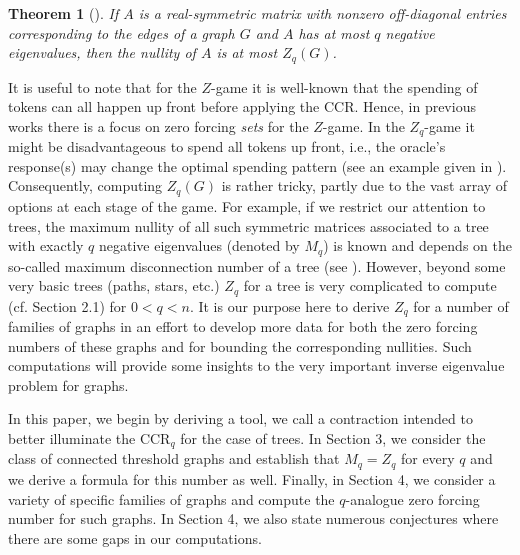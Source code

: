 \documentclass[3p,times,12pt]{article}
\newtheorem{theorem}{Theorem}[section]
\begin{document}
\begin{theorem}[\cite{BGH}]
If $A$ is a real-symmetric matrix with nonzero off-diagonal entries corresponding to the edges of a graph $G$ \emph{and} $A$ has at most $q$ negative eigenvalues, then the nullity of $A$ is at most  $Z_q(G)$.
\end{theorem}

It is useful to note that for the $Z$-game it is well-known that the spending of tokens can all happen up front before applying the CCR.  Hence, in previous works there is a focus on zero forcing \emph{sets} for the $Z$-game.  In the $Z_q$-game it might be disadvantageous to spend all tokens up front, i.e., the oracle's response(s) may change the optimal spending pattern (see an example given in \cite{BGH}). Consequently, computing $Z_q(G)$ is rather tricky, partly due to the vast array of options at each stage of the game. For example, if we restrict our attention to trees, the maximum nullity of all such symmetric matrices associated to a tree with exactly $q$ negative eigenvalues (denoted by $M_q$) is known and depends on the so-called maximum disconnection number of a tree (see \cite{BHL}). However, beyond some very basic trees (paths, stars, etc.) $Z_q$ for a tree is very complicated to compute (cf. Section 2.1) for $0 < q < n$. It is our purpose here to derive $Z_q$ for a number of families of graphs in an effort to develop more data for both the zero forcing numbers of these graphs and for bounding the corresponding nullities. Such computations will provide some insights to the very important inverse eigenvalue problem for graphs.

In this paper, we begin by deriving a tool, we call a contraction intended to better illuminate the CCR$_{q}$ for the case of trees. 
In Section 3, we consider the class of connected threshold graphs and establish that $M_q=Z_q$ for every $q$ and we derive a formula for this number as well. Finally, in Section 4, we consider a variety of specific families of graphs and compute the $q$-analogue zero forcing number for such graphs. In Section 4, we also state numerous conjectures where there are some gaps in our computations.
\end{document}
